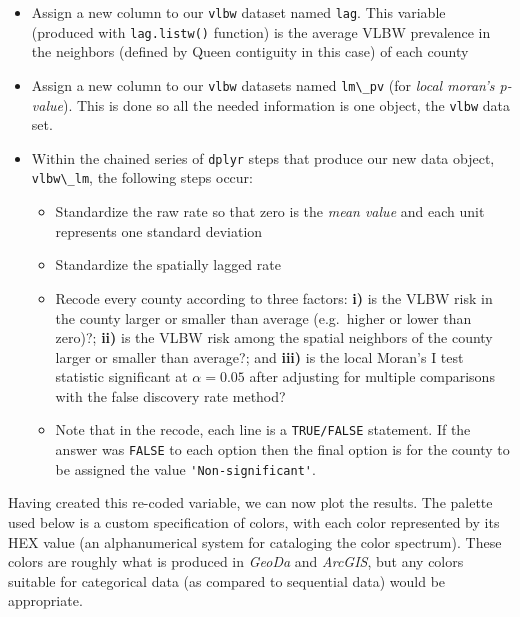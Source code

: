 \documentclass[
]{book}
\newcommand{\passthrough}[1]{#1}
\providecommand{\tightlist}{%
  \setlength{\itemsep}{0pt}\setlength{\parskip}{0pt}}
\begin{document}
\begin{itemize}
\tightlist
\item
  Assign a new column to our \passthrough{\lstinline!vlbw!} dataset named \passthrough{\lstinline!lag!}. This variable (produced with \passthrough{\lstinline!lag.listw()!} function) is the average VLBW prevalence in the neighbors (defined by Queen contiguity in this case) of each county
\item
  Assign a new column to our \passthrough{\lstinline!vlbw!} datasets named \passthrough{\lstinline!lm\_pv!} (for \emph{local moran's p-value}). This is done so all the needed information is one object, the \passthrough{\lstinline!vlbw!} data set.
\item
  Within the chained series of \passthrough{\lstinline!dplyr!} steps that produce our new data object, \passthrough{\lstinline!vlbw\_lm!}, the following steps occur:

  \begin{itemize}
  \tightlist
  \item
    Standardize the raw rate so that zero is the \emph{mean value} and each unit represents one standard deviation
  \item
    Standardize the spatially lagged rate
  \item
    Recode every county according to three factors: \textbf{i)} is the VLBW risk in the county larger or smaller than average (e.g.~higher or lower than zero)?; \textbf{ii)} is the VLBW risk among the spatial neighbors of the county larger or smaller than average?; and \textbf{iii)} is the local Moran's I test statistic significant at \(\alpha = 0.05\) after adjusting for multiple comparisons with the false discovery rate method?
  \item
    Note that in the recode, each line is a \passthrough{\lstinline!TRUE/FALSE!} statement. If the answer was \passthrough{\lstinline!FALSE!} to each option then the final option is for the county to be assigned the value \passthrough{\lstinline!'Non-significant'!}.
  \end{itemize}
\end{itemize}

Having created this re-coded variable, we can now plot the results. The palette used below is a custom specification of colors, with each color represented by its HEX value (an alphanumerical system for cataloging the color spectrum). These colors are roughly what is produced in \emph{GeoDa} and \emph{ArcGIS}, but any colors suitable for categorical data (as compared to sequential data) would be appropriate.
\end{document}
